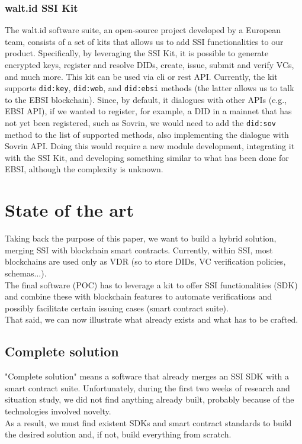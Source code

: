 \subsubsection{walt.id SSI Kit}
The walt.id\cite{site:waltid} software suite, an open-source project developed by a European team, 
consists of a set of kits that allows us to add SSI functionalities to our product. 
Specifically, by leveraging the SSI Kit\cite{site:ssikit}, it is possible to generate encrypted 
keys, register and resolve DIDs, create, issue, submit and verify VCs, and much more. 
This kit can be used via \acrfull{cli} or \acrshort{rest} API. Currently, the 
kit supports \texttt{did:key}, \texttt{did:web}, and \texttt{did:ebsi} methods (the 
latter allows us to talk to the EBSI blockchain). Since, by default, it dialogues with 
other APIs (e.g., EBSI API), if we wanted to register, for example, a DID in a 
mainnet that has not yet been registered, such as Sovrin, we would need to add the 
\texttt{did:sov} method to the list of supported methods, also implementing the 
dialogue with Sovrin API. Doing this would require a new module development, 
integrating it with the SSI Kit, and developing something similar to what has been 
done for EBSI, although the complexity is unknown.
\section{State of the art}
Taking back the purpose of this paper, we want to build a hybrid solution, merging SSI 
with blockchain smart contracts. Currently, within SSI, most blockchains are used only 
as VDR (so to store DIDs, VC verification policies, schemas...).\\
The final software (POC) has to leverage a kit to offer SSI functionalities (SDK) and 
combine these with blockchain features to automate verifications and possibly 
facilitate certain issuing cases (smart contract suite).\\
That said, we can now illustrate what already exists and what has to be crafted.
\subsection{Complete solution}
"Complete solution" means a software that already merges an SSI SDK with a smart 
contract suite. Unfortunately, during the first two weeks of research and situation 
study, we did not find anything already built, probably because of the technologies 
involved novelty.\\
As a result, we must find existent SDKs and smart contract standards to build the 
desired solution and, if not, build everything from scratch.
